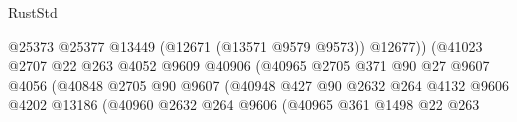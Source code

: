 \begin{lexlean}{RustStd}
\begin{coremodule}
                                                        @25373
                                                        @25377
                                                        @13449
                                                        (@12671 (@13571 @9579 @9573))
                                                        @12677))
                                                    (@41023
                                                      @2707
                                                      @22
                                                      @263
                                                      @4052
                                                      @9609
                                                      @40906
                                                      (@40965
                                                        @2705
                                                        @371
                                                        @90
                                                        @27
                                                        @9607
                                                        @4056
                                                        (@40848
                                                          @2705
                                                          @90
                                                          @9607
                                                          (@40948
                                                            @427
                                                            @90
                                                            @2632
                                                            @264
                                                            @4132
                                                            @9606
                                                            @4202
                                                            @13186
                                                            (@40960
                                                              @2632
                                                              @264
                                                              @9606
                                                              (@40965
                                                                @361
                                                                @1498
                                                                @22
                                                                @263

\end{coremodule}
\end{lexlean}
